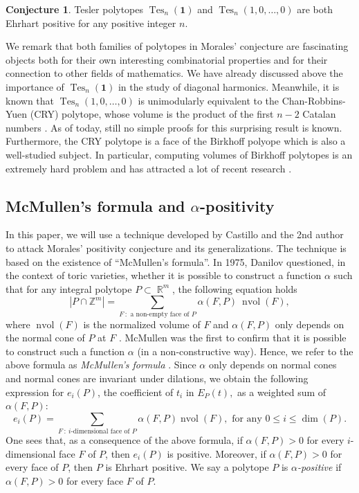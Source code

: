 \documentclass[12pt]{amsart}
\numberwithin{equation}{section}
\theoremstyle{definition}
\newtheorem{conj}[thm]{Conjecture}
\def\nvol{\operatorname{nvol}}
\def\tes{\operatorname{Tes}}
\def\R{\operatorname{\mathbb{R}}}
\begin{document}
\begin{conj} \cite{Moralesconjecture} \label{conj}
Tesler polytopes $\tes_{n}(\boldsymbol{1})$ and $\tes_{n}(1,0,\dots, 0)$ are both Ehrhart positive for any positive integer $n$.
\end{conj}

We remark that both families of polytopes in Morales' conjecture are fascinating objects both for their own interesting combinatorial properties and for their connection to other fields of mathematics.
We have already discussed above the importance of $\tes_{n}(\boldsymbol{1})$ in the study of diagonal harmonics. 
Meanwhile, it is known \cite{corteel2017volumes} that $\tes_{n}(1,0,\dots,0)$ is unimodularly equivalent to the Chan-Robbins-Yuen (CRY) polytope, whose volume is the product of the first $n-2$ Catalan numbers \cite{chan2000volume, zeilberger1999proof}. As of today, still no simple proofs for this surprising result is known.
Furthermore, the CRY polytope is a face of the Birkhoff polyope which is also a well-studied subject. In particular, computing volumes of Birkhoff polytopes is an extremely hard problem and has attracted a lot of recent research \cite{canfield2007asymptotic, de2009generating, pak2000four}. 

\subsection{McMullen's formula and $\alpha$-positivity} In this paper, we will use a technique developed by Castillo and the 2nd author \cite{castillo2018berline} to attack Morales' positivity conjecture and its generalizations. The technique is based on the existence of ``McMullen's formula''. 
In 1975, Danilov questioned, in the context of toric varieties, whether it is possible to construct a function $\alpha$ such that for any integral polytope $P \subset \R^{m}$, the following equation holds 
\[|P\cap \mathbb{Z}^{m}|=\sum_{F~:\text{ a non-empty face of }P} \alpha(F,P) \ \nvol(F),\]
where $\nvol(F)$ is the normalized volume of $F$ and $\alpha(F,P)$ only depends on the normal cone of $P$ at $F$ \cite{danilov1978geometry}. 
McMullen was the first to confirm that it is possible to construct such a function $\alpha$ (in a non-constructive way). Hence, we refer to the above formula as \emph{McMullen's formula} \cite{mcmullen1993valuations}. Since $\alpha$ only depends on normal cones and normal cones are invariant under dilations, we obtain the following expression for $e_i(P)$, the coefficient of $t_i$ in $E_P(t),$ as a weighted sum of $\alpha(F,P):$ 
\begin{equation} \label{maccoeffi}
    e_{i}(P)=\sum_{F~:~i\text{-dimensional face of }P}\alpha(F,P)\nvol(F), \text{ for any }0 \leq i \leq \dim(P).
\end{equation}
One sees that, as a consequence of the above formula, if $\alpha(F,P)>0$ for every $i$-dimensional face $F$ of $P$, then $e_{i}(P)$ is positive. Moreover, if $\alpha(F,P)>0$ for every face of $P$, then $P$ is Ehrhart positive. We say a polytope $P$ is \emph{$\alpha$-positive} if $\alpha(F,P)>0$ for every face $F$ of $P$. 
\end{document}
